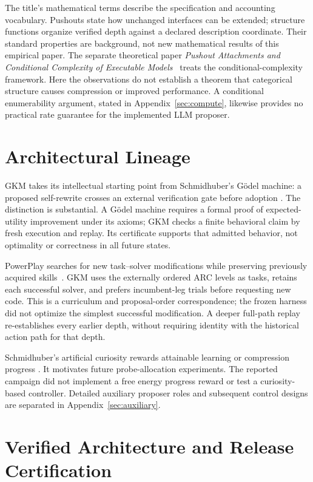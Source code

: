 \documentclass[11pt]{article}
\theoremstyle{definition}
\theoremstyle{remark}
\begin{document}
The title's mathematical terms describe the specification and accounting vocabulary.
Pushouts state how unchanged interfaces can be extended; structure functions organize
verified depth against a declared description coordinate. Their standard properties
are background, not new mathematical results of this empirical paper. The separate
theoretical paper \emph{Pushout Attachments and Conditional Complexity of Executable
Models}~\cite{pushoutmodels} treats the conditional-complexity framework. Here the
observations do not establish a theorem that categorical structure causes compression
or improved performance. A conditional enumerability argument, stated in
Appendix~\ref{sec:compute}, likewise provides no practical rate guarantee for the
implemented LLM proposer.

\section{Architectural Lineage}
GKM takes its intellectual starting point from Schmidhuber's G\"odel machine:
a proposed self-rewrite crosses an external verification gate before adoption
\cite{schmidhuber2007godel}. The distinction is substantial. A G\"odel machine
requires a formal proof of expected-utility improvement under its axioms; GKM checks
a finite behavioral claim by fresh execution and replay. Its certificate supports
that admitted behavior, not optimality or correctness in all future states.

PowerPlay searches for new task--solver modifications while preserving previously
acquired skills~\cite{schmidhuber2013powerplay}. GKM uses the externally ordered ARC
levels as tasks, retains each successful solver, and prefers incumbent-leg trials
before requesting new code. This is a curriculum and proposal-order correspondence;
the frozen harness did not optimize the simplest successful modification. A deeper
full-path replay re-establishes every earlier depth, without requiring identity with
the historical action path for that depth.

Schmidhuber's artificial curiosity rewards attainable learning or compression progress
\cite{schmidhuber2010curiosity}. It motivates future probe-allocation experiments.
The reported campaign did not implement a free energy progress reward or test a
curiosity-based controller. Detailed auxiliary proposer roles and subsequent control
designs are separated in Appendix~\ref{sec:auxiliary}.

\section{Verified Architecture and Release Certification}
\label{sec:implementation}
\end{document}
